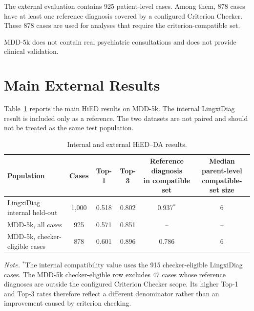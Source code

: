 \documentclass[12pt,a4paper,oneside]{report}
\begin{document}
The external evaluation contains 925 patient-level cases. Among them,
878 cases have at least one reference diagnosis covered by a configured
Criterion Checker. These 878 cases are used for analyses that require
the criterion-compatible set.

MDD-5k does not contain real psychiatric consultations and does not
provide clinical validation.

\section{Main External Results}
\label{sec:external-populations}
\label{sec:external-main-performance}

Table~\ref{tab:external-summary-rewrite} reports the main HiED results
on MDD-5k. The internal LingxiDiag result is included only as a reference.
The two datasets are not paired and should not be treated as the same
test population.

\begin{table}[htbp]
\centering
\caption{Internal and external HiED--DA results.}
\label{tab:external-summary-rewrite}
\small
\begin{adjustbox}{max width=\textwidth}
\begin{tabular}{|l|c|c|c|c|c|}
\hline
\textbf{Population} &
\textbf{Cases} &
\textbf{Top-1} &
\textbf{Top-3} &
\shortstack{\textbf{Reference diagnosis}\\
\textbf{in compatible set}} &
\shortstack{\textbf{Median parent-level}\\
\textbf{compatible-set size}}\\
\hline
LingxiDiag internal held-out &
1,000 &
0.518 &
0.802 &
0.937$^{*}$ &
6\\
\hline
MDD-5k, all cases &
925 &
0.571 &
0.851 &
-- &
--\\
\hline
MDD-5k, checker-eligible cases &
878 &
0.601 &
0.896 &
0.786 &
6\\
\hline
\end{tabular}
\end{adjustbox}

\parbox{0.96\textwidth}{\footnotesize
\textit{Note.} $^{*}$The internal compatibility value uses the 915
checker-eligible LingxiDiag cases. The MDD-5k checker-eligible row
excludes 47 cases whose reference diagnoses are outside the configured
Criterion Checker scope. Its higher Top-1 and Top-3 rates therefore
reflect a different denominator rather than an improvement caused by
criterion checking.
}
\end{table}
\end{document}
